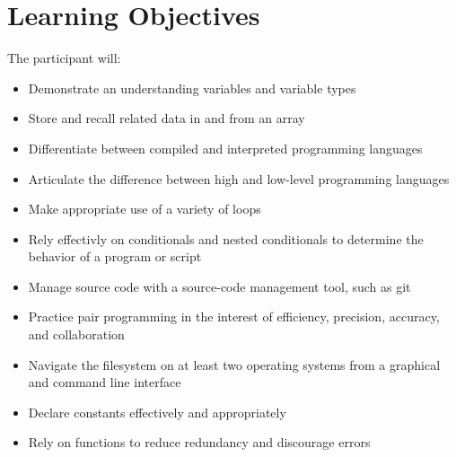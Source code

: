 \documentclass[letterpaper,10pt,english]{sphinxmanual}
\begin{document}
\section{Learning Objectives}
\label{programming:learning-objectives}
The participant will:
\begin{itemize}
\item {} 
Demonstrate an understanding variables and variable types

\item {} 
Store and recall related data in and from an array

\item {} 
Differentiate between compiled and interpreted programming languages

\item {} 
Articulate the difference between high and low-level programming languages

\item {} 
Make appropriate use of a variety of loops

\item {} 
Rely effectivly on conditionals and nested conditionals to determine the behavior of a program or script

\item {} 
Manage source code with a source-code management tool, such as git

\item {} 
Practice pair programming in the interest of efficiency, precision, accuracy, and collaboration

\item {} 
Navigate the filesystem on at least two operating systems from a graphical and command line interface

\item {} 
Declare constants effectively and appropriately

\item {} 
Rely on functions to reduce redundancy and discourage errors

\end{itemize}

\end{document}
